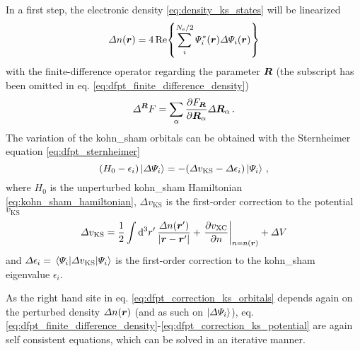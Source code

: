 \documentclass[main.tex]{subfiles}
\begin{document}
In a first step, the electronic density \ref{eq:density_ks_states} will be linearized
\begin{equation}\label{eq:dfpt_finite_difference_density}
    \Delta n(\vb*{r}) = 4 \Re{\sum_i^{N_{\mathrm{e}} / 2} \Psi_i^* (\vb*{r}) \Delta \Psi_i (\vb*{r})}
\end{equation}
with the finite-difference operator regarding the parameter \(\vb*{R}\) (the subscript has been omitted in eq. \ref{eq:dfpt_finite_difference_density})
\begin{equation}
    \Delta^{\vb*{R}} F = \sum_{\alpha} \pdv{F_{\vb*{R}}}{\vb*{R}_{\alpha}} \Delta \vb*{R}_{\alpha}\,.
\end{equation}
The variation of the \acrshort{kohn_sham} orbitals can be obtained with the Sternheimer equation \ref{eq:dfpt_sternheimer}
\begin{equation}\label{eq:dfpt_correction_ks_orbitals}
    (H_0 - \epsilon_i) \ket{\Delta \Psi_i} = - (\Delta v_{\mathrm{KS}} - \Delta \epsilon_i) \ket{\Psi_i}\,,
\end{equation}
where \(H_0\) is the unperturbed \acrshort{kohn_sham} Hamiltonian \ref{eq:kohn_sham_hamiltonian}, \(\Delta v_{\mathrm{KS}}\) is the first-order correction to the potential \(v_{\mathrm{KS}}\)
\begin{equation}\label{eq:dfpt_correction_ks_potential}
    \Delta v_{\mathrm{KS}} = \frac{1}{2} \int \dd[3]{r^{\prime}} \frac{\Delta n(\vb*{r}^{\prime})}{\vert \vb*{r} - \vb*{r}^{\prime} \vert} + \left. \pdv{v_{\mathrm{XC}}}{n} \right\vert_{n = n(\vb*{r})} + \Delta V
\end{equation}
and \(\Delta \epsilon_i = \expval{\Delta v_{\mathrm{KS}}}{\Psi_i}\) is the first-order correction to the \acrshort{kohn_sham} eigenvalue \(\epsilon_i\).

As the right hand site in eq. \ref{eq:dfpt_correction_ks_orbitals} depends again on the perturbed density \(\Delta n(\vb*{r})\) (and as such on \(\ket{\Delta \Psi_i}\)), eq. \ref{eq:dfpt_finite_difference_density}-\ref{eq:dfpt_correction_ks_potential} are again self consistent equations, which can be solved in an iterative manner.
\end{document}
